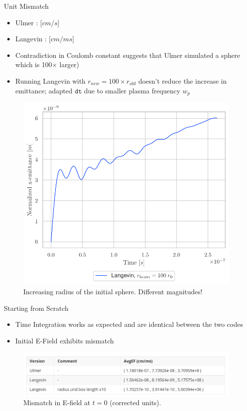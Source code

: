\begin{frame}{Unit Mismatch}
        \begin{itemize}
            \item Ulmer : [$cm/s$]
            \item Langevin : [$cm/ms$]
            \item Contradiction in Coulomb constant suggests that Ulmer simulated a sphere which is 100$\times $ larger)
            \item Running Langevin with $r_{new} = 100 \times r_{old}$ doesn't reduce the increase in emittance; adapted $\texttt{dt}$ due to smaller plasma frequency $w_p$
        \end{itemize}
        \begin{figure}[!htb]
        \centering
        \captionsetup{justification=centering}
          \includegraphics[width=0.45\linewidth]{figures/large_radius.pdf}
            \caption{Increasing radius of the initial sphere. Different magnitudes!}
          \label{fig:increased_radius}
        \end{figure}
\end{frame}

\begin{frame}{Starting from Scratch}

        \begin{itemize}
            \item Time Integration works as expected and are identical between the two codes
            \item Initial E-Field exhibits mismatch 
        \end{itemize}

        \begin{figure}[!htb]
            \centering
            \captionsetup{justification=centering}
          \includegraphics[width=0.9\linewidth]{figures/initial_Efield.png}
            \caption{Mismatch in E-field at $t=0$ (corrected units).}
          \label{fig:increased_radius}
        \end{figure}
\end{frame}


